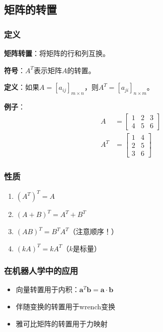 \documentclass[12pt,a4paper]{article}
\begin{document}
\subsection{矩阵的转置}

\subsubsection{定义}

\textbf{矩阵转置}：将矩阵的行和列互换。

\textbf{符号}：$A^T$表示矩阵$A$的转置。

\textbf{定义}：如果$A = [a_{ij}]_{m \times n}$，则$A^T = [a_{ji}]_{n \times m}$。

\textbf{例子}：
\begin{align}
A &= \begin{bmatrix} 1 & 2 & 3 \\ 4 & 5 & 6 \end{bmatrix} \\
A^T &= \begin{bmatrix} 1 & 4 \\ 2 & 5 \\ 3 & 6 \end{bmatrix}
\end{align}

\subsubsection{性质}

\begin{enumerate}
\item $(A^T)^T = A$
\item $(A + B)^T = A^T + B^T$
\item $(AB)^T = B^T A^T$（注意顺序！）
\item $(kA)^T = kA^T$（$k$是标量）
\end{enumerate}

\subsubsection{在机器人学中的应用}

\begin{itemize}
\item 向量转置用于内积：$\bm{a}^T \bm{b} = \bm{a} \cdot \bm{b}$
\item 伴随变换的转置用于wrench变换
\item 雅可比矩阵的转置用于力映射
\end{itemize}
\end{document}
